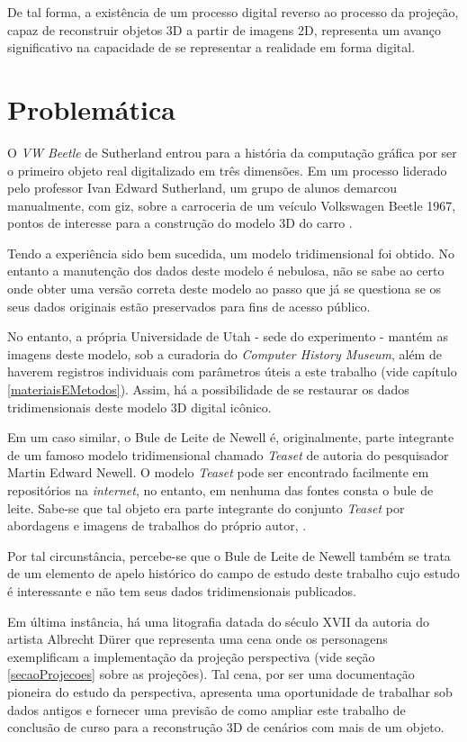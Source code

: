 	De tal forma, a existência de um processo digital reverso ao processo da projeção, capaz de reconstruir objetos 3D a partir de imagens 2D, representa um avanço significativo na capacidade de se representar a realidade em forma digital.
	
\section{Problemática}

	O \textit{VW Beetle} de Sutherland entrou para a história da computação gráfica por ser o primeiro objeto real digitalizado em três dimensões. Em um processo liderado pelo professor Ivan Edward Sutherland, um grupo de alunos demarcou manualmente, com giz, sobre a carroceria de um veículo Volkswagen Beetle 1967, pontos de interesse para a construção do modelo 3D do carro \cite{MappingSutherlandVW}.
	
	Tendo a experiência sido bem sucedida, um modelo tridimensional foi obtido. No entanto a manutenção dos dados deste modelo é nebulosa, não se sabe ao certo onde obter uma versão correta deste modelo ao passo que já se questiona se os seus dados originais estão preservados para fins de acesso público.
	
	No entanto, a própria Universidade de Utah - sede do experimento - mantém as imagens deste modelo, sob a curadoria do \textit{Computer History Museum}, além de haverem registros individuais com parâmetros úteis a este trabalho (vide capítulo \ref{materiaisEMetodos}). Assim, há a possibilidade de se restaurar os dados tridimensionais deste modelo 3D digital icônico.
	
	Em um caso similar, o Bule de Leite de Newell é, originalmente, parte integrante de um famoso modelo tridimensional chamado \textit{Teaset} de autoria do pesquisador Martin Edward Newell. O modelo \textit{Teaset} pode ser encontrado facilmente em repositórios na \textit{internet}, no entanto, em nenhuma das fontes consta o bule de leite. Sabe-se que tal objeto era parte integrante do conjunto \textit{Teaset} por abordagens e imagens de trabalhos do próprio autor, \cite{newellResearch}. 
	
	Por tal circunstância, percebe-se que o Bule de Leite de Newell também se trata de um elemento de apelo histórico do campo de estudo deste trabalho cujo estudo é interessante e não tem seus dados tridimensionais publicados.
	
	Em última instância, há uma litografia datada do século XVII da autoria do artista Albrecht Dürer que representa uma cena onde os personagens exemplificam a implementação da projeção perspectiva (vide seção \ref{secaoProjecoes} sobre as projeções). Tal cena, por ser uma documentação pioneira do estudo da perspectiva, apresenta uma oportunidade de trabalhar sob dados antigos e fornecer uma previsão de como ampliar este trabalho de conclusão de curso para a reconstrução 3D de cenários com mais de um objeto.
	
